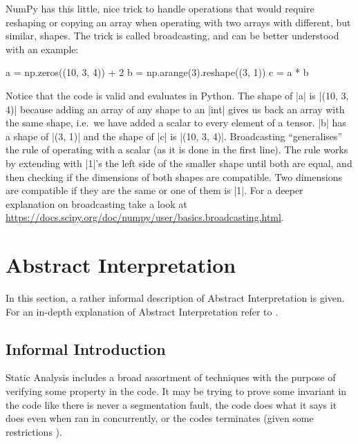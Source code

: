 NumPy has this little, nice trick to handle operations that would
require reshaping or copying an array when operating with two arrays
with different, but similar, shapes. The trick is called broadcasting,
and can be better understood with an example:

\begin{pythoncode}
a = np.zeros((10, 3, 4)) + 2
b = np.arange(3).reshape((3, 1))
c = a * b
\end{pythoncode}

Notice that the code is valid and evaluates in Python. The shape of
\pycode|a| is \pycode|(10, 3, 4)| because adding an array of any shape
to an \pycode|int| gives us back an array with the same shape, i.e.~we
have added a scalar to every element of a tensor. \pycode|b| has a shape
of \pycode|(3, 1)| and the shape of \pycode|c| is
\pycode|(10, 3, 4)|. Broadcasting \enquote{generalises} the rule of
operating with a scalar (as it is done in the first line). The rule
works by extending with \pycode|1|'s the left side of the smaller shape
until both are equal, and then checking if the dimensions of both shapes
are compatible. Two dimensions are compatible if they are the same or one of
them is \pycode|1|. For a deeper explanation on broadcasting take a look
at \url{https://docs.scipy.org/doc/numpy/user/basics.broadcasting.html}.

\section{Abstract Interpretation}\label{abstract-interpretation}

In this section, a rather informal description of Abstract
Interpretation is given. For an in-depth explanation of Abstract
Interpretation refer to \autocites[Chapters 1 and
4]{nielson2015principles}{cousot_abstract_1977}{nipkow_abstract_2014}.

\subsection{Informal Introduction}\label{informal-introduction}

Static Analysis includes a broad assortment of techniques with the
purpose of verifying some property in the code. It may be trying to
prove some invariant in the code like there is never a segmentation
fault, the code does what it says it does even when ran in concurrently,
or the codes terminates (given some restrictions
\autocite{urban_static_2015}).

